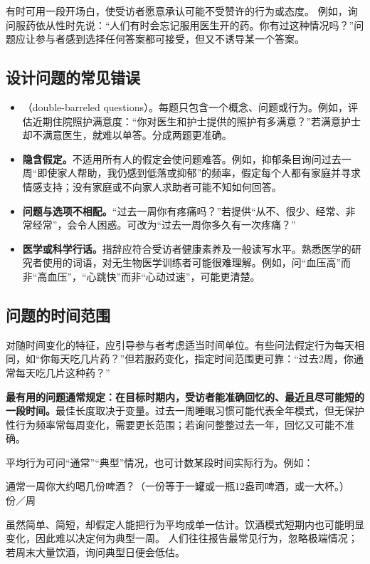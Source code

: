 有时可用一段开场白，使受访者愿意承认可能不受赞许的行为或态度。
例如，询问服药依从性时先说：“人们有时会忘记服用医生开的药。你有过这种情况吗？”问题应让参与者感到选择任何答案都可接受，但又不诱导某一个答案。

\subsection{设计问题的常见错误}
\begin{itemize}
\item {}（double-barreled questions）。每题只包含一个概念、问题或行为。例如，评估近期住院照护满意度：“你对医生和护士提供的照护有多满意？”若满意护士却不满意医生，就难以单答。分成两题更准确。
\item \textbf{隐含假定。}不适用所有人的假定会使问题难答。例如，抑郁条目询问过去一周“即使家人帮助，我仍感到低落或抑郁”的频率，假定每个人都有家庭并寻求情感支持；没有家庭或不向家人求助者可能不知如何回答。
\item \textbf{问题与选项不相配。}“过去一周你有疼痛吗？”若提供“从不、很少、经常、非常经常”，会令人困惑。可改为“过去一周你多久有一次疼痛？”
\item \textbf{医学或科学行话。}措辞应符合受访者健康素养及一般读写水平。熟悉医学的研究者使用的词语，对无生物医学训练者可能很难理解。例如，问“血压高”而非“高血压”，“心跳快”而非“心动过速”，可能更清楚。
\end{itemize}

\subsection{问题的时间范围}
对随时间变化的特征，应引导参与者考虑适当时间单位。有些问法假定行为每天相同，如“你每天吃几片药？”但若服药变化，指定时间范围更可靠：“过去2周，你通常每天吃几片这种药？”

\textbf{最有用的问题通常规定：在目标时期内，受访者能准确回忆的、最近且尽可能短的一段时间。}最佳长度取决于变量。过去一周睡眠习惯可能代表全年模式，但无保护性行为频率常每周变化，需要更长范围；若询问整整过去一年，回忆又可能不准确。

平均行为可问“通常”“典型”情况，也可计数某段时间实际行为。例如：
\begin{studyquote}通常一周你大约喝几份啤酒？（一份等于一罐或一瓶12盎司啤酒，或一大杯。）\\\underline{\hspace{1.5cm}}份／周\end{studyquote}
虽然简单、简短，却假定人能把行为平均成单一估计。饮酒模式短期内也可能明显变化，因此难以决定何为典型一周。
人们往往报告最常见行为，忽略极端情况；若周末大量饮酒，询问典型日便会低估。

